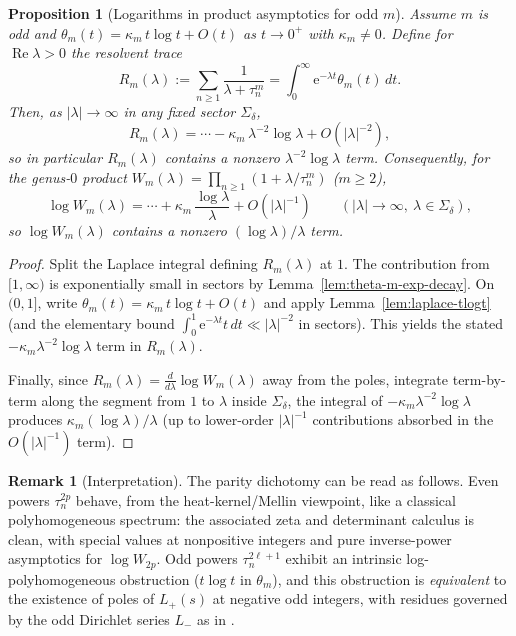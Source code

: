 \documentclass[11pt,letterpaper]{amsart}
\numberwithin{equation}{section}
\newtheorem{proposition}[theorem]{Proposition}
\theoremstyle{definition}
\newtheorem{remark}[theorem]{Remark}
\newcommand{\Ree}{\operatorname{Re}}
\newcommand{\e}{\mathrm{e}}
\begin{document}
\begin{proposition}[Logarithms in product asymptotics for odd $m$]\label{prop:odd-loglambda}
Assume $m$ is odd and $\theta_m(t)=\kappa_m\,t\log t+O(t)$ as $t\to0^+$ with $\kappa_m\neq0$.
Define for $\Ree\lambda>0$ the resolvent trace
\[
R_m(\lambda):=\sum_{n\ge1}\frac{1}{\lambda+\tau_n^m}=\int_0^\infty \e^{-\lambda t}\theta_m(t)\,dt.
\]
Then, as $|\lambda|\to\infty$ in any fixed sector $\Sigma_\delta$,
\[
R_m(\lambda)=\cdots -\kappa_m\,\lambda^{-2}\log\lambda + O(|\lambda|^{-2}),
\]
so in particular $R_m(\lambda)$ contains a nonzero $\lambda^{-2}\log\lambda$ term.
Consequently, for the genus-$0$ product $W_m(\lambda)=\prod_{n\ge1}(1+\lambda/\tau_n^m)$ ($m\ge2$),
\[
\log W_m(\lambda)=\cdots + \kappa_m\,\frac{\log\lambda}{\lambda} + O(|\lambda|^{-1})
\qquad (|\lambda|\to\infty,\ \lambda\in\Sigma_\delta),
\]
so $\log W_m(\lambda)$ contains a nonzero $(\log\lambda)/\lambda$ term.
\end{proposition}

\begin{proof}
Split the Laplace integral defining $R_m(\lambda)$ at $1$.
The contribution from $[1,\infty)$ is exponentially small in sectors by Lemma~\ref{lem:theta-m-exp-decay}.
On $(0,1]$, write $\theta_m(t)=\kappa_m\,t\log t + O(t)$ and apply Lemma~\ref{lem:laplace-tlogt}
(and the elementary bound $\int_0^1 \e^{-\lambda t}t\,dt\ll |\lambda|^{-2}$ in sectors).
This yields the stated $-\kappa_m\lambda^{-2}\log\lambda$ term in $R_m(\lambda)$.

Finally, since $R_m(\lambda)=\frac{d}{d\lambda}\log W_m(\lambda)$ away from the poles,
integrate term-by-term along the segment from $1$ to $\lambda$ inside $\Sigma_\delta$,
the integral of $-\kappa_m\lambda^{-2}\log\lambda$ produces $\kappa_m(\log\lambda)/\lambda$ (up to lower-order
$|\lambda|^{-1}$ contributions absorbed in the $O(|\lambda|^{-1})$ term).
\end{proof}

\begin{remark}[Interpretation]
The parity dichotomy can be read as follows.
Even powers $\tau_n^{2p}$ behave, from the heat-kernel/Mellin viewpoint, like a classical
polyhomogeneous spectrum: the associated zeta and determinant calculus is clean, with special values
at nonpositive integers and pure inverse-power asymptotics for $\log W_{2p}$.
Odd powers $\tau_n^{2\ell+1}$ exhibit an intrinsic log-polyhomogeneous obstruction
($t\log t$ in $\theta_m$), and this obstruction is \emph{equivalent} to the existence of
poles of $L_+(s)$ at negative odd integers, with residues governed by the odd Dirichlet series $L_-$
as in \cite[\S10.2]{BOCRS}.
\end{remark}



\end{document}
